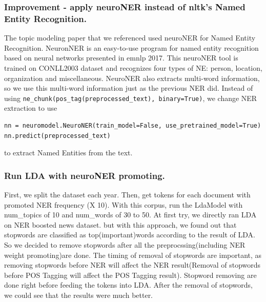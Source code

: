 \subsubsection{Improvement - apply neuroNER instead of nltk's Named Entity Recognition.} 
The topic modeling paper that we referenced used neuroNER for Named Entity Recognition. NeuronNER is an easy-to-use program for named entity recognition based on neural networks presented in emnlp 2017. \cite{2017neuroner} This neuroNER tool is trained on CONLL2003 dataset and recognizes four types of NE: person, location, organization and miscellaneous. NeuroNER also extracts multi-word information, so we use this multi-word information just as the previous NER did. Instead of using
\texttt{ne_chunk(pos_tag(preprocessed_text), binary=True)}, we change NER extraction to use

\begin{verbatim}
nn = neuromodel.NeuroNER(train_model=False, use_pretrained_model=True)
nn.predict(preprocessed_text)
\end{verbatim}
to extract Named Entities from the text.

\subsubsection{Run LDA with neuroNER promoting.}
First, we split the dataset each year. Then, get tokens for each document with promoted NER frequency (X 10). With this corpus, run the LdaModel with num\_topics of 10 and num\_words of 30 to 50. At first try, we directly ran LDA on NER boosted news dataset. but with this approach, we found out that stopwords are classified as top(important)words according to the result of LDA. So we decided to remove stopwords after all the preprocssing(including NER weight promoting)are done. The timing of removal of stopwords are important, as removing stopwords before NER will affect the NER result(Removal of stopwords before POS Tagging will affect the POS Tagging result). Stopword removing are done right before feeding the tokens into LDA. After the removal of stopwords, we could see that the results were much better.

